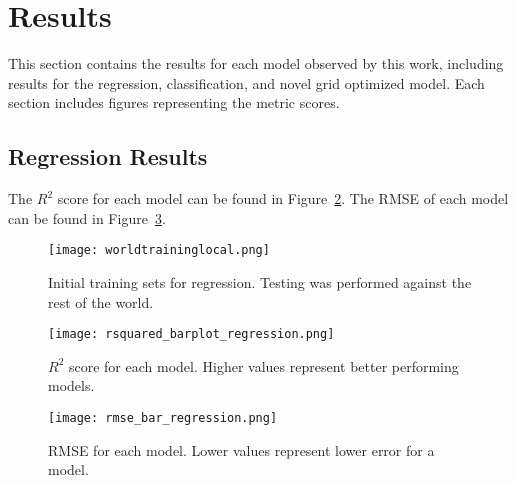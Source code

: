\section{Results}
\label{sec:results}
\setlength{\parindent}{10ex}

This section contains the results for each model observed by this work, including results for the regression, classification, and novel grid optimized model.
Each section includes figures representing the metric scores.

\subsection{Regression Results}
The \(R^2\) score for each model can be found in Figure~\ref{fig:r2_barplot_regression}.
The RMSE of each model can be found in Figure~\ref{fig:rmse_barplot_regression}.



\begin{figure}[htp]
    \centering
    \texttt{[image: worldtraininglocal.png]}
    \caption{Initial training sets for regression. Testing was performed against the rest of the world.}
    \label{fig:trainset}
\end{figure}


\begin{figure}[htp]
    \centering
    \texttt{[image: rsquared\_barplot\_regression.png]}
    \caption{\(R^2\) score for each model. Higher values represent better performing models.}
    \label{fig:r2_barplot_regression}
\end{figure}

\begin{figure}[htp]
    \centering
    \texttt{[image: rmse\_bar\_regression.png]} 
    \caption{RMSE for each model. Lower values represent lower error for a model.}
    \label{fig:rmse_barplot_regression}
\end{figure}


